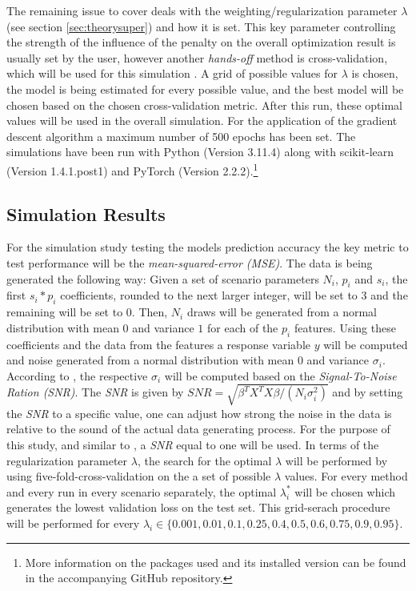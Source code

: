 \documentclass[12pt,a4paper]{article}
\begin{document}
The remaining issue to cover deals with the weighting/regularization parameter $\lambda$ (see section \ref{sec:theorysuper}) and how it is set. This key parameter controlling the strength of the influence of the penalty on the overall optimization result is usually set by the user, however another \textit{hands-off} method is cross-validation, which will be used for this simulation \parencite[250--251]{ESL2009}. A grid of possible values for $\lambda$ is chosen, the model is being estimated for every possible value, and the best model will be chosen based on the chosen cross-validation metric. After this run, these optimal values will be used in the overall simulation. For the application of the gradient descent algorithm a maximum number of 500 epochs has been set. The simulations have been run with Python (Version 3.11.4) along with scikit-learn (Version 1.4.1.post1) and PyTorch (Version 2.2.2).\footnote{More information on the packages used and its installed version can be found in the accompanying GitHub repository.}

\subsection{Simulation Results} 

For the simulation study testing the models prediction accuracy the key metric to test performance will be the \textit{mean-squared-error (MSE)}. The data is being generated the following way: Given a set of scenario parameters $N_i$, $p_i$ and $s_i$, the first $s_i*p_i$ coefficients, rounded to the next larger integer, will be set to $3$ and the remaining will be set to $0$. Then, $N_i$ draws will be generated from a normal distribution with mean $0$ and variance $1$ for each of the $p_i$ features. Using these coefficients and the data from the features a response variable $y$ will be computed and noise generated from a normal distribution with mean $0$ and variance $\sigma_i$. According to \textcite{WangEtAl2020}, the respective $\sigma_i$ will be computed based on the \textit{Signal-To-Noise Ration (SNR)}. The \textit{SNR} is given by $SNR = \sqrt{\beta^TX^TX\beta/(N_i\sigma_i^2)}$ and by setting the \textit{SNR} to a specific value, one can adjust how strong the noise in the data is relative to the sound of the actual data generating process. For the purpose of this study, and similar to \textcite{WangEtAl2020}, a \textit{SNR} equal to one will be used. In terms of the regularization parameter $\lambda$, the search for the optimal $\lambda$ will be performed by using five-fold-cross-validation on the a set of possible $\lambda$ values. For every method and every run in every scenario separately, the optimal $\lambda^*_i$ will be chosen which generates the lowest validation loss on the test set. This grid-serach procedure will be performed for every $\lambda_i \in \{0.001, 0.01, 0.1, 0.25, 0.4, 0.5, 0.6, 0.75, 0.9, 0.95\}$.\\
\end{document}
